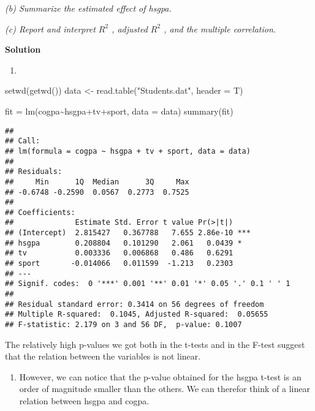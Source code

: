 \documentclass[
]{article}
\newenvironment{Shaded}{\begin{snugshade}}{\end{snugshade}}
\newcommand{\AttributeTok}[1]{\textcolor[rgb]{0.77,0.63,0.00}{#1}}
\newcommand{\FunctionTok}[1]{\textcolor[rgb]{0.00,0.00,0.00}{#1}}
\newcommand{\NormalTok}[1]{#1}
\newcommand{\OtherTok}[1]{\textcolor[rgb]{0.56,0.35,0.01}{#1}}
\newcommand{\SpecialCharTok}[1]{\textcolor[rgb]{0.00,0.00,0.00}{#1}}
\newcommand{\StringTok}[1]{\textcolor[rgb]{0.31,0.60,0.02}{#1}}
\providecommand{\tightlist}{%
  \setlength{\itemsep}{0pt}\setlength{\parskip}{0pt}}
\begin{document}
\emph{(b) Summarize the estimated effect of hsgpa.}

\emph{(c) Report and interpret \(R^2\) , adjusted \(R^2\) , and the
multiple correlation.}

\textbf{Solution}

\begin{enumerate}
\def\labelenumi{\alph{enumi})}
\tightlist
\item
\end{enumerate}

\begin{Shaded}
\begin{Highlighting}[]
\FunctionTok{setwd}\NormalTok{(}\FunctionTok{getwd}\NormalTok{())}
\NormalTok{data }\OtherTok{\textless{}{-}} \FunctionTok{read.table}\NormalTok{(}\StringTok{"Students.dat"}\NormalTok{, }\AttributeTok{header =}\NormalTok{ T)}

\NormalTok{fit }\OtherTok{=} \FunctionTok{lm}\NormalTok{(cogpa}\SpecialCharTok{\textasciitilde{}}\NormalTok{hsgpa}\SpecialCharTok{+}\NormalTok{tv}\SpecialCharTok{+}\NormalTok{sport, }\AttributeTok{data =}\NormalTok{ data)}
\FunctionTok{summary}\NormalTok{(fit)}
\end{Highlighting}
\end{Shaded}

\begin{verbatim}
## 
## Call:
## lm(formula = cogpa ~ hsgpa + tv + sport, data = data)
## 
## Residuals:
##     Min      1Q  Median      3Q     Max 
## -0.6748 -0.2590  0.0567  0.2773  0.7525 
## 
## Coefficients:
##              Estimate Std. Error t value Pr(>|t|)    
## (Intercept)  2.815427   0.367788   7.655 2.86e-10 ***
## hsgpa        0.208804   0.101290   2.061   0.0439 *  
## tv           0.003336   0.006868   0.486   0.6291    
## sport       -0.014066   0.011599  -1.213   0.2303    
## ---
## Signif. codes:  0 '***' 0.001 '**' 0.01 '*' 0.05 '.' 0.1 ' ' 1
## 
## Residual standard error: 0.3414 on 56 degrees of freedom
## Multiple R-squared:  0.1045, Adjusted R-squared:  0.05655 
## F-statistic: 2.179 on 3 and 56 DF,  p-value: 0.1007
\end{verbatim}

The relatively high p-values we got both in the t-tests and in the
F-test suggest that the relation between the variables is not linear.

\begin{enumerate}
\def\labelenumi{\alph{enumi})}
\setcounter{enumi}{1}
\tightlist
\item
  However, we can notice that the p-value obtained for the hsgpa t-test
  is an order of magnitude smaller than the others. We can therefor
  think of a linear relation between hsgpa and cogpa.
\end{enumerate}
\end{document}
